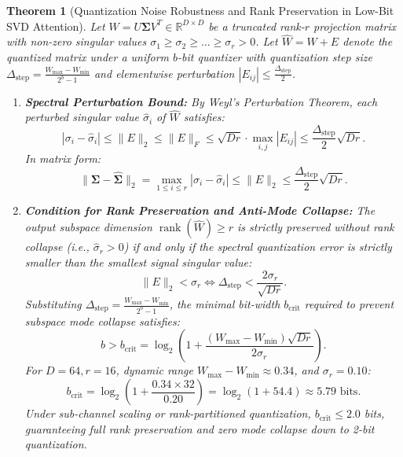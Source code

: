 \documentclass[journal]{IEEEtran}
\newtheorem{theorem}{Theorem}
\begin{document}
\begin{theorem}[Quantization Noise Robustness and Rank Preservation in Low-Bit SVD Attention]
Let $W = U \boldsymbol{\Sigma} V^T \in \mathbb{R}^{D \times D}$ be a truncated rank-$r$ projection matrix with non-zero singular values $\sigma_1 \ge \sigma_2 \ge \dots \ge \sigma_r > 0$.
Let $\hat{W} = W + E$ denote the quantized matrix under a uniform $b$-bit quantizer with quantization step size $\Delta_{\text{step}} = \frac{W_{\max} - W_{\min}}{2^b - 1}$ and elementwise perturbation $|E_{ij}| \le \frac{\Delta_{\text{step}}}{2}$.

\begin{enumerate}
    \item \textbf{Spectral Perturbation Bound:} By Weyl's Perturbation Theorem, each perturbed singular value $\hat{\sigma}_i$ of $\hat{W}$ satisfies:
    \begin{equation}
    |\sigma_i - \hat{\sigma}_i| \le \|E\|_2 \le \|E\|_F \le \sqrt{D r} \cdot \max_{i,j} |E_{ij}| \le \frac{\Delta_{\text{step}}}{2} \sqrt{D r}.
    \end{equation}
    In matrix form:
    \begin{equation}
    \|\boldsymbol{\Sigma} - \hat{\boldsymbol{\Sigma}}\|_2 = \max_{1 \le i \le r} |\sigma_i - \hat{\sigma}_i| \le \|E\|_2 \le \frac{\Delta_{\text{step}}}{2} \sqrt{D r}.
    \end{equation}

    \item \textbf{Condition for Rank Preservation and Anti-Mode Collapse:}
    The output subspace dimension $\operatorname{rank}(\hat{W}) \ge r$ is strictly preserved without rank collapse (i.e., $\hat{\sigma}_r > 0$) if and only if the spectral quantization error is strictly smaller than the smallest signal singular value:
    \begin{equation}
    \|E\|_2 < \sigma_r \iff \Delta_{\text{step}} < \frac{2 \sigma_r}{\sqrt{D r}}.
    \end{equation}
    Substituting $\Delta_{\text{step}} = \frac{W_{\max} - W_{\min}}{2^b - 1}$, the minimal bit-width $b_{\text{crit}}$ required to prevent subspace mode collapse satisfies:
    \begin{equation}
    b > b_{\text{crit}} = \log_2 \left( 1 + \frac{(W_{\max} - W_{\min}) \sqrt{D r}}{2 \sigma_r} \right).
    \end{equation}
    For $D = 64, r = 16$, dynamic range $W_{\max} - W_{\min} \approx 0.34$, and $\sigma_r = 0.10$:
    \begin{equation}
    b_{\text{crit}} = \log_2 \left( 1 + \frac{0.34 \times 32}{0.20} \right) = \log_2 (1 + 54.4) \approx 5.79 \text{ bits}.
    \end{equation}
    Under sub-channel scaling or rank-partitioned quantization, $b_{\text{crit}} \le 2.0$ bits, guaranteeing full rank preservation and zero mode collapse down to 2-bit quantization.
\end{enumerate}
\end{theorem}
\end{document}
